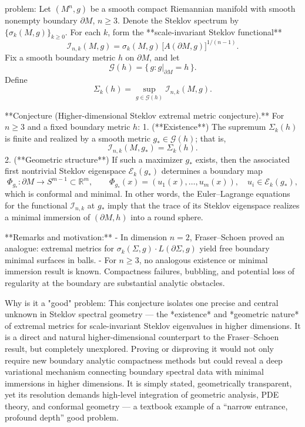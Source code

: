 problem:  
Let \( (M^n,g) \) be a smooth compact Riemannian manifold with smooth nonempty boundary \( \partial M \), \(n\ge3\). Denote the Steklov spectrum by \(\{\sigma_k(M,g)\}_{k\ge0}\).  
For each \(k\), form the **scale-invariant Steklov functional**
\[
\mathcal{I}_{n,k}(M,g) = \sigma_k(M,g)\,\big[A(\partial M,g)\big]^{1/(n-1)}.
\]
Fix a smooth boundary metric \(h\) on \(\partial M\), and let
\[
\mathcal{G}(h) = \{\, g : g|_{\partial M} = h \,\}.
\]
Define
\[
\Sigma_k(h) = \sup_{g \in \mathcal{G}(h)} \mathcal{I}_{n,k}(M,g).
\]

**Conjecture (Higher-dimensional Steklov extremal metric conjecture).**  
For \(n\ge3\) and a fixed boundary metric \(h\):  
1. (**Existence**) The supremum \(\Sigma_k(h)\) is finite and realized by a smooth metric \(g_*\in\mathcal{G}(h)\); that is,
   \[
   \mathcal{I}_{n,k}(M,g_*) = \Sigma_k(h).
   \]
2. (**Geometric structure**) If such a maximizer \(g_*\) exists, then the associated first nontrivial Steklov eigenspace \(\mathcal{E}_{k}(g_*)\) determines a boundary map
   \[
   \Phi_{g_*}:\partial M\to S^{m-1}\subset \mathbb{R}^m,\qquad
   \Phi_{g_*}(x)=(u_1(x),\dots,u_m(x)),\quad u_i\in\mathcal{E}_k(g_*),
   \]
   which is conformal and minimal.  
   In other words, the Euler–Lagrange equations for the functional \(\mathcal{I}_{n,k}\) at \(g_*\) imply that the trace of its Steklov eigenspace realizes a minimal immersion of \((\partial M,h)\) into a round sphere.

**Remarks and motivation:**  
- In dimension \(n=2\), Fraser–Schoen proved an analogue: extremal metrics for \(\sigma_k(\Sigma,g) \cdot L(\partial\Sigma,g)\) yield free boundary minimal surfaces in balls.  
- For \(n\ge3\), no analogous existence or minimal immersion result is known. Compactness failures, bubbling, and potential loss of regularity at the boundary are substantial analytic obstacles.

Why is it a "good" problem:  
This conjecture isolates one precise and central unknown in Steklov spectral geometry — the *existence* and *geometric nature* of extremal metrics for scale-invariant Steklov eigenvalues in higher dimensions. It is a direct and natural higher-dimensional counterpart to the Fraser–Schoen result, but completely unexplored. Proving or disproving it would not only require new boundary analytic compactness methods but could reveal a deep variational mechanism connecting boundary spectral data with minimal immersions in higher dimensions. It is simply stated, geometrically transparent, yet its resolution demands high-level integration of geometric analysis, PDE theory, and conformal geometry — a textbook example of a “narrow entrance, profound depth” good problem.
